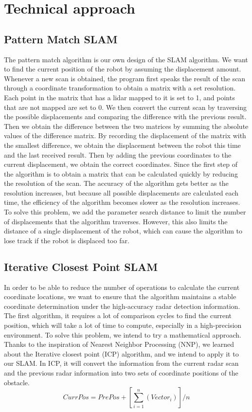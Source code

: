 \documentclass[conference]{IEEEtran}
\begin{document}
\section{Technical  approach}
\subsection{Pattern Match SLAM}
The pattern match algorithm is our own design of the SLAM algorithm. We want to find the current position of the robot by assuming the displacement amount. Whenever a new scan is obtained, the program first speaks the result of the scan through a coordinate transformation to obtain a matrix with a set resolution. Each point in the matrix that has a lidar mapped to it is set to 1, and points that are not mapped are set to 0. We then convert the current scan by traversing the possible displacements and comparing the difference with the previous result. Then we obtain the difference between the two matrices by summing the absolute values of the difference matrix. By recording the displacement of the matrix with the smallest difference, we obtain the displacement between the robot this time and the last received result. Then by adding the previous coordinates to the current displacement, we obtain the correct coordinates. Since the first step of the algorithm is to obtain a matrix that can be calculated quickly by reducing the resolution of the scan. The accuracy of the algorithm gets better as the resolution increases, but because all possible displacements are calculated each time, the efficiency of the algorithm becomes slower as the resolution increases. To solve this problem, we add the parameter search distance to limit the number of displacements that the algorithm traverses. However, this also limits the distance of a single displacement of the robot, which can cause the algorithm to lose track if the robot is displaced too far.

\subsection{Iterative Closest Point SLAM}
In order to be able to reduce the number of operations to calculate the current coordinate locations, we want to ensure that the algorithm maintains a stable coordinate determination under the high-accuracy radar detection information. The first algorithm, it requires a lot of comparison cycles to find the current position, which will take a lot of time to compute, especially in a high-precision environment. To solve this problem, we intend to try a mathematical approach. Thanks to the inspiration of Nearest Neighbor Processing (NNP), we learned about the Iterative closest point (ICP) algorithm, and we intend to apply it to our SLAM. In ICP, it will convert the information from the current radar scan and the previous radar information into two sets of coordinate positions of the obstacle. 
\begin{equation}
    CurrPos = PrePos + [\sum_{i=1}^{n}(Vector_i)]/n\label{eqICP}
\end{equation}
\end{document}
